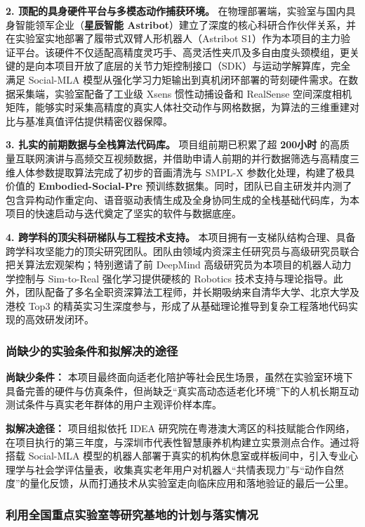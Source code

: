 \textbf{2. 顶配的具身硬件平台与多模态动作捕获环境。} 
在物理部署端，实验室与国内具身智能领军企业（\textbf{星辰智能 Astribot}）建立了深度的核心科研合作伙伴关系，并在实验室实地部署了履带式双臂人形机器人（Astribot S1）作为本项目的主力验证平台。该硬件不仅适配高精度灵巧手、高灵活性夹爪及多自由度头颈模组，更关键的是向本项目开放了底层的关节力矩控制接口（SDK）与运动学解算库，完全满足 Social-MLA 模型从强化学习力矩输出到真机闭环部署的苛刻硬件需求。在数据采集端，实验室配备了工业级 Xsens 惯性动捕设备和 RealSense 空间深度相机矩阵，能够实时采集高精度的真实人体社交动作与网格数据，为算法的三维重建对比与基准真值评估提供精密仪器保障。

\textbf{3. 扎实的前期数据与全栈算法代码库。} 
项目组前期已积累了超 \textbf{200小时} 的高质量互联网演讲与高频交互视频数据，并借助申请人前期的并行数据筛选与高精度三维人体参数提取算法完成了初步的音画清洗与 SMPL-X 参数化处理，构建了极具价值的 \textbf{Embodied-Social-Pre} 预训练数据集。同时，团队已自主研发并内测了包含异构动作重定向、语音驱动表情生成及全身协同生成的全栈基础代码库，为本项目的快速启动与迭代奠定了坚实的软件与数据底座。

\textbf{4. 跨学科的顶尖科研梯队与工程技术支持。} 
本项目拥有一支梯队结构合理、具备跨学科攻坚能力的顶尖研究团队。团队由领域内资深主任研究员与高级研究员联合把关算法宏观架构；特别邀请了前 DeepMind 高级研究员为本项目的机器人动力学控制与 Sim-to-Real 强化学习提供硬核的 Robotics 技术支持与理论指导。此外，团队配备了多名全职资深算法工程师，并长期吸纳来自清华大学、北京大学及港校 Top3 的精英实习生深度参与，形成了从基础理论推导到复杂工程落地代码实现的高效研发闭环。

\subsubsection{尚缺少的实验条件和拟解决的途径}

\textbf{尚缺少条件：} 本项目最终面向适老化陪护等社会民生场景，虽然在实验室环境下具备完善的硬件与仿真条件，但尚缺乏“真实高动态适老化环境”下的人机长期互动测试条件与真实老年群体的用户主观评价样本库。

\textbf{拟解决途径：} 项目组拟依托 IDEA 研究院在粤港澳大湾区的科技赋能合作网络，在项目执行的第三年度，与深圳市代表性智慧康养机构建立实景测点合作。通过将搭载 Social-MLA 模型的机器人部署于真实的机构休息室或样板间中，引入专业心理学与社会学评估量表，收集真实老年用户对机器人“共情表现力”与“动作自然度”的量化反馈，从而打通技术从实验室走向临床应用和落地验证的最后一公里。

\subsubsection{利用全国重点实验室等研究基地的计划与落实情况}

